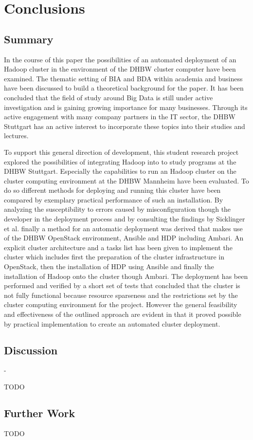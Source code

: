 \chapter{Conclusions}
\label{chap:conc}

\section{Summary}

In the course of this paper the possibilities of an automated deployment of an Hadoop cluster in the environment of the \ac{DHBW} cluster computer have been examined.
The thematic setting of \ac{BIA} and \ac{BDA} within academia and business have been discussed to build a theoretical background for the paper. 
It has been concluded that the field of study around Big Data is still under active investigation and is gaining growing importance for many businesses.
Through its active engagement with many company partners in the \ac{IT} sector, the \ac{DHBW} Stuttgart has an active interest to incorporate these topics into their studies and lectures.

To support this general direction of development, this student research project explored the possibilities of integrating Hadoop into to study programs at the \ac{DHBW} Stuttgart.
Especially the capabilities to run an Hadoop cluster on the cluster computing environment at the \ac{DHBW} Mannheim have been evaluated.
To do so different methods for deploying and running this cluster have been compared 
by exemplary practical performance of such an installation. 
By analyzing the susceptibility to errors caused by misconfiguration though the developer in the deployment process and by consulting the findings by Sicklinger et al. finally a method for an automatic deployment was derived that makes use of the \ac{DHBW} OpenStack environment, Ansible and \acf{HDP} including Ambari.
An explicit cluster architecture and a tasks list has been given to implement the cluster which includes first the preparation of the cluster infrastructure in OpenStack, then the installation of \ac{HDP} using Ansible and finally the installation of Hadoop onto the cluster though Ambari.
The deployment has been performed and verified by a short set of tests that concluded that the cluster is not fully functional because resource sparseness and the restrictions set by the cluster computing environment for the project.
However the general feasibility and effectiveness of the outlined approach are evident in that it proved possible by practical implementation to create an automated cluster deployment.

\section{Discussion}

- 

TODO

\section{Further Work}

TODO
